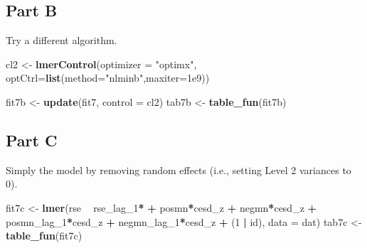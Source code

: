\documentclass[]{article}
\newenvironment{Shaded}{\begin{snugshade}}{\end{snugshade}}
\newcommand{\KeywordTok}[1]{\textcolor[rgb]{0.13,0.29,0.53}{\textbf{#1}}}
\newcommand{\DataTypeTok}[1]{\textcolor[rgb]{0.13,0.29,0.53}{#1}}
\newcommand{\DecValTok}[1]{\textcolor[rgb]{0.00,0.00,0.81}{#1}}
\newcommand{\FloatTok}[1]{\textcolor[rgb]{0.00,0.00,0.81}{#1}}
\newcommand{\StringTok}[1]{\textcolor[rgb]{0.31,0.60,0.02}{#1}}
\newcommand{\OperatorTok}[1]{\textcolor[rgb]{0.81,0.36,0.00}{\textbf{#1}}}
\newcommand{\NormalTok}[1]{#1}
\begin{document}
\subsection{Part B}\label{part-b-5}

Try a different algorithm.

\begin{Shaded}
\begin{Highlighting}[]
\NormalTok{cl2 <-}\StringTok{ }\KeywordTok{lmerControl}\NormalTok{(}\DataTypeTok{optimizer =} \StringTok{"optimx"}\NormalTok{,}
                  \DataTypeTok{optCtrl=}\KeywordTok{list}\NormalTok{(}\DataTypeTok{method=}\StringTok{"nlminb"}\NormalTok{,}\DataTypeTok{maxiter=}\FloatTok{1e9}\NormalTok{))}

\NormalTok{fit7b <-}\StringTok{ }\KeywordTok{update}\NormalTok{(fit7, }\DataTypeTok{control =}\NormalTok{ cl2)}
\NormalTok{tab7b <-}\StringTok{ }\KeywordTok{table_fun}\NormalTok{(fit7b)}
\end{Highlighting}
\end{Shaded}

\subsection{Part C}\label{part-c}

Simply the model by removing random effects (i.e., setting Level 2
variances to 0).

\begin{Shaded}
\begin{Highlighting}[]
\NormalTok{fit7c <-}\StringTok{ }\KeywordTok{lmer}\NormalTok{(rse }\OperatorTok{~}\StringTok{ }\NormalTok{rse_lag_}\DecValTok{1}\OperatorTok{*}\StringTok{ }\OperatorTok{+}\StringTok{ }\NormalTok{posmn}\OperatorTok{*}\NormalTok{cesd_z }\OperatorTok{+}\StringTok{ }\NormalTok{negmn}\OperatorTok{*}\NormalTok{cesd_z }\OperatorTok{+}\StringTok{ }\NormalTok{posmn_lag_}\DecValTok{1}\OperatorTok{*}\NormalTok{cesd_z }\OperatorTok{+}
\StringTok{                }\NormalTok{negmn_lag_}\DecValTok{1}\OperatorTok{*}\NormalTok{cesd_z }\OperatorTok{+}\StringTok{ }\NormalTok{(}\DecValTok{1} \OperatorTok{|}\StringTok{ }\NormalTok{id), }\DataTypeTok{data =}\NormalTok{ dat)}
\NormalTok{tab7c <-}\StringTok{ }\KeywordTok{table_fun}\NormalTok{(fit7c)}
\end{Highlighting}
\end{Shaded}
\end{document}
